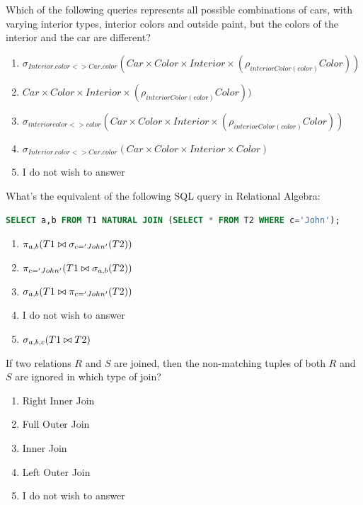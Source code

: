 \documentclass{bdad}
\begin{document}
Which of the following queries represents all possible combinations of cars, with varying interior types, interior colors and outside paint, but the colors of the interior and the car are different? 

\begin{enumerate}
    \item $\sigma_{Interior.color <> Car.color} (Car \times Color \times Interior \times (\rho_{interiorColor(color)} Color))$
    \item $Car \times Color \times Interior \times (\rho_{interiorColor(color)} Color))$
    \item $\sigma_{interiorcolor <> color} (Car \times Color \times Interior \times (\rho_{interiorColor(color)} Color))$
    \item $\sigma_{Interior.color <> Car.color} (Car \times Color \times Interior \times Color)$
    \item I do not wish to answer
\end{enumerate}

What's the equivalent of the following SQL query in Relational Algebra:

\begin{lstlisting}[language=SQL, numbers=none, frame=none, belowskip=0pt]
SELECT a,b FROM T1 NATURAL JOIN (SELECT * FROM T2 WHERE c='John');
\end{lstlisting}

\begin{enumerate}
    \item $\pi_{a,b} (T1 \bowtie \sigma_{c='John'} (T2))$
    \item $\pi_{c='John'} (T1 \bowtie \sigma_{a,b} (T2))$
    \item $\sigma_{a,b} (T1 \bowtie \pi_{c='John'} (T2))$
    \item I do not wish to answer
    \item $\sigma_{a,b,c} (T1 \bowtie T2)$
\end{enumerate}

If two relations $R$ and $S$ are joined, then the non-matching tuples of both $R$ and $S$ are ignored in which type of join?

\begin{enumerate}
    \item Right Inner Join
    \item Full Outer Join
    \item Inner Join
    \item Left Outer Join
    \item I do not wish to answer
\end{enumerate}
\end{document}
